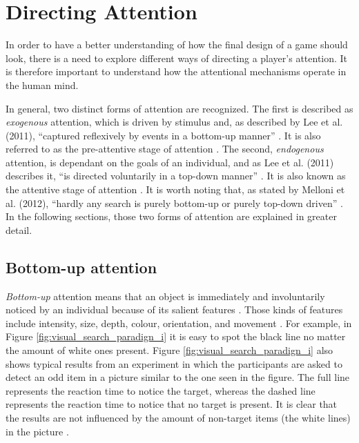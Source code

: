\section{Directing Attention}\label{sec:direct_attention}
In order to have a better understanding of how the final design of a game should look, there is a need to explore different ways of directing a player's attention. It is therefore important to understand how the attentional mechanisms operate in the human mind.

In general, two distinct forms of attention are recognized. The first is described as \textit{exogenous} attention, which is driven by stimulus and, as described by Lee et al. (2011), “captured reflexively by events in a bottom-up manner” \cite{lee2011efficient}. It is also referred to as the pre-attentive stage of attention \cite{zhai2008scalable}. The second, \textit{endogenous} attention, is dependant on the goals of an individual, and as Lee et al. (2011) describes it, “is directed voluntarily in a top-down manner” \cite{lee2011efficient}. It is also known as the attentive stage of attention \cite{zhai2008scalable}. It is worth noting that, as stated by Melloni et al. (2012), “hardly any search is purely bottom-up or purely top-down driven” \cite{melloni2012interaction}. In the following sections, those two forms of attention are explained in greater detail.

\subsection{Bottom-up attention}\label{subsec:bottomup_attention}
\textit{Bottom-up} attention means that an object is immediately and involuntarily noticed by an individual because of its salient features \cite{melloni2012interaction}. Those kinds of features include intensity, size, depth, colour, orientation, and movement \cite{zhai2008scalable}. For example, in Figure \ref{fig:visual_search_paradign_i} it is easy to spot the black line no matter the amount of white ones present. Figure \ref{fig:visual_search_paradign_i} also shows typical results from an experiment in which the participants are asked to detect an odd item in a picture similar to the one seen in the figure. The full line represents the reaction time to notice the target, whereas the dashed line represents the reaction time to notice that no target is present. It is clear that the results are not influenced by the amount of non-target items (the white lines) in the picture \cite{snowden2012basic}.

